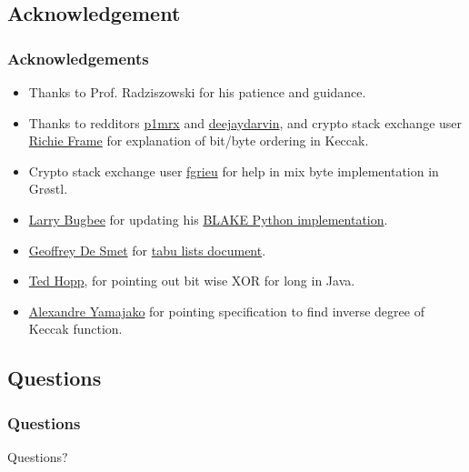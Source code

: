 \documentclass{beamer}
\begin{document}
\subsection{Acknowledgement}

\begin{frame}
\frametitle{Acknowledgements}
\begin{itemize}
\item Thanks to Prof. Radziszowski for his patience and guidance.
\item Thanks to redditors \href{"http://www.reddit.com/user/p1mrx"}{p1mrx} and 
\href{"http://www.reddit.com/user/deejaydarvin"}{deejaydarvin}, and crypto stack exchange user 
\href{"http://crypto.stackexchange.com/users/8050/richie-frame"}{Richie Frame} for explanation of bit/byte 
ordering in Keccak.
\item Crypto stack exchange user \href{"http://crypto.stackexchange.com/users/555/fgrieu"}{fgrieu} for help
in mix byte implementation in Gr{\o}stl.
\item \href{"http://www.seanet.com/~bugbee"}{Larry Bugbee} for updating his 
\href{http://www.seanet.com/~bugbee/crypto/blake/}{BLAKE Python implementation}.
\item \href{"http://stackoverflow.com/users/472109/geoffrey-de-smet"}{Geoffrey De Smet} for 
\href{"http://docs.jboss.org/drools/release/latest/optaplanner-docs/html\_single/index.html\#tabuSearch"}
{tabu lists document}.
\item \href{"http://stackoverflow.com/users/535871/ted-hopp"}{Ted Hopp}, for pointing out bit wise XOR for long in Java.
\item \href{"http://crypto.stackexchange.com/users/4136/alexandre-yamajako"}{Alexandre Yamajako} for pointing
specification to find inverse degree of Keccak function.
\end{itemize}
\end{frame}

\subsection{Questions}

\begin{frame}
\frametitle{Questions}
Questions?
\end{frame}
\end{document}
